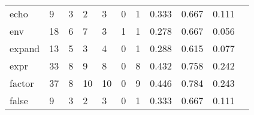 \begin{longtable}{lp{1.2cm}p{1.2cm}p{1.2cm}p{1.2cm}p{1.2cm}p{1.2cm}p{1.2cm}p{1.2cm}p{1.2cm}p{1.2cm}}
echo      &                                     9 &                                                  3 &                                                  2 &                                                  3 &                                                  0 &                                                  1 &                                         0.333 &                                              0.667 &                                              0.111 \\
env       &                                    18 &                                                  6 &                                                  7 &                                                  3 &                                                  1 &                                                  1 &                                         0.278 &                                              0.667 &                                              0.056 \\
expand    &                                    13 &                                                  5 &                                                  3 &                                                  4 &                                                  0 &                                                  1 &                                         0.288 &                                              0.615 &                                              0.077 \\
expr      &                                    33 &                                                  8 &                                                  9 &                                                  8 &                                                  0 &                                                  8 &                                         0.432 &                                              0.758 &                                              0.242 \\
factor    &                                    37 &                                                  8 &                                                 10 &                                                 10 &                                                  0 &                                                  9 &                                         0.446 &                                              0.784 &                                              0.243 \\
false     &                                     9 &                                                  3 &                                                  2 &                                                  3 &                                                  0 &                                                  1 &                                         0.333 &                                              0.667 &                                              0.111 \\

\end{longtable}
